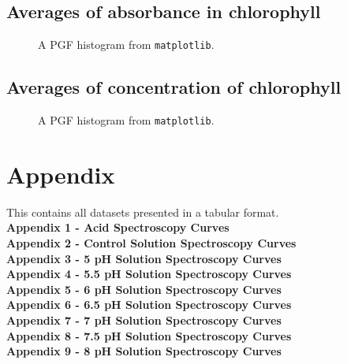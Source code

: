 \documentclass[a4paper]{article}
\begin{document}
\subsection*{Averages of absorbance in chlorophyll}
\begin{center}
\begin{figure}[h]
        
    \caption{A PGF histogram from \texttt{matplotlib}.}
\end{figure}
\end{center}
\newpage

\subsection*{Averages of concentration of chlorophyll}
\begin{center}
\begin{figure}[h]
        
    \caption{A PGF histogram from \texttt{matplotlib}.}
\end{figure}
\end{center}
\newpage

\section*{Appendix}
This contains all datasets presented in a tabular format. \\
\textbf{Appendix 1 - Acid Spectroscopy Curves} \\
\textbf{Appendix 2 - Control Solution Spectroscopy Curves} \\
\textbf{Appendix 3 - 5 pH Solution Spectroscopy Curves} \\
\textbf{Appendix 4 - 5.5 pH Solution Spectroscopy Curves} \\
\textbf{Appendix 5 - 6 pH Solution Spectroscopy Curves} \\
\textbf{Appendix 6 - 6.5 pH Solution Spectroscopy Curves} \\
\textbf{Appendix 7 - 7 pH Solution Spectroscopy Curves} \\
\textbf{Appendix 8 - 7.5 pH Solution Spectroscopy Curves} \\
\textbf{Appendix 9 - 8 pH Solution Spectroscopy Curves} \\









\newpage
\end{document}
